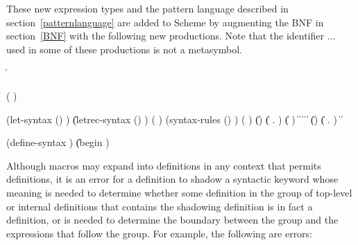 These new expression types and the pattern language described in
section~\ref{patternlanguage} are added to Scheme by augmenting the
BNF in section~\ref{BNF} with the following new productions.  Note
that the identifier {\cf ...} used in some of these productions is not
a metasymbol.

\begin{grammar}%
 \: 
\>  \| 

 \: ( )
 \: 

 \:
\>  \> (let-syntax () )
\>  \| (letrec-syntax () )
 \: ( )
 \:
\>  \> (syntax-rules () )
 \: ( )
 \: 
\>  \| ()
\>  \| ( . )
\>  \| (  )
\>  \| 
 \: 
\>  \| 
\>  \| 
\>  \| 
\>  \| 
 \: 
\>  \| ()
\>  \| ( . )
\>  \| 
 \: 
\>  \|  
 \: 
 \: 
 \: 

 \: 
 \:
\>  \> (define-syntax  )
\>  \| (begin )%
\end{grammar}

%

Although macros may expand into definitions in any context that permits
definitions, it is an error for a definition to shadow a syntactic
keyword whose meaning is needed to determine whether some definition in
the group of top-level or internal definitions that contains the
shadowing definition is in fact a definition, or is needed to determine
the boundary between the group and the expressions that follow the
group.  For example, the following are errors:

